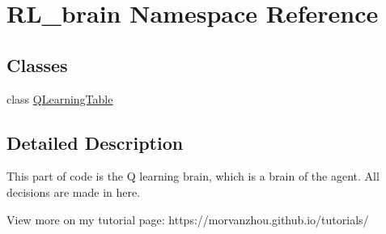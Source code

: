 \hypertarget{namespaceRL__brain}{}\section{R\+L\+\_\+brain Namespace Reference}
\label{namespaceRL__brain}
\subsection*{Classes}
\begin{DoxyCompactItemize}
\item 
class \mbox{\hyperlink{classRL__brain_1_1QLearningTable}{Q\+Learning\+Table}}
\end{DoxyCompactItemize}


\subsection{Detailed Description}
\begin{DoxyVerb}This part of code is the Q learning brain, which is a brain of the agent.
All decisions are made in here.

View more on my tutorial page: https://morvanzhou.github.io/tutorials/
\end{DoxyVerb}
 